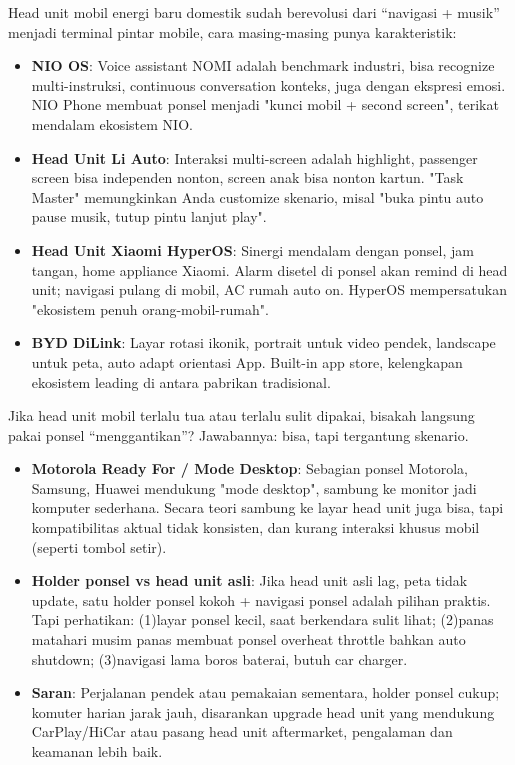 Head unit mobil energi baru domestik sudah berevolusi dari “navigasi + musik” menjadi terminal pintar mobile, cara masing-masing punya karakteristik:

\begin{itemize}
  \item \textbf{NIO OS}: Voice assistant NOMI adalah benchmark industri, bisa recognize multi-instruksi, continuous conversation konteks, juga dengan ekspresi emosi. NIO Phone membuat ponsel menjadi "kunci mobil + second screen", terikat mendalam ekosistem NIO.
  \item \textbf{Head Unit Li Auto}: Interaksi multi-screen adalah highlight, passenger screen bisa independen nonton, screen anak bisa nonton kartun. "Task Master" memungkinkan Anda customize skenario, misal "buka pintu auto pause musik, tutup pintu lanjut play".
  \item \textbf{Head Unit Xiaomi HyperOS}: Sinergi mendalam dengan ponsel, jam tangan, home appliance Xiaomi. Alarm disetel di ponsel akan remind di head unit; navigasi pulang di mobil, AC rumah auto on. HyperOS mempersatukan "ekosistem penuh orang-mobil-rumah".
  \item \textbf{BYD DiLink}: Layar rotasi ikonik, portrait untuk video pendek, landscape untuk peta, auto adapt orientasi App. Built-in app store, kelengkapan ekosistem leading di antara pabrikan tradisional.
\end{itemize}


Jika head unit mobil terlalu tua atau terlalu sulit dipakai, bisakah langsung pakai ponsel “menggantikan”? Jawabannya: bisa, tapi tergantung skenario.

\begin{itemize}
  \item \textbf{Motorola Ready For / Mode Desktop}: Sebagian ponsel Motorola, Samsung, Huawei mendukung "mode desktop", sambung ke monitor jadi komputer sederhana. Secara teori sambung ke layar head unit juga bisa, tapi kompatibilitas aktual tidak konsisten, dan kurang interaksi khusus mobil (seperti tombol setir).
  \item \textbf{Holder ponsel vs head unit asli}: Jika head unit asli lag, peta tidak update, satu holder ponsel kokoh + navigasi ponsel adalah pilihan praktis. Tapi perhatikan: (1)layar ponsel kecil, saat berkendara sulit lihat; (2)panas matahari musim panas membuat ponsel overheat throttle bahkan auto shutdown; (3)navigasi lama boros baterai, butuh car charger.
  \item \textbf{Saran}: Perjalanan pendek atau pemakaian sementara, holder ponsel cukup; komuter harian jarak jauh, disarankan upgrade head unit yang mendukung CarPlay/HiCar atau pasang head unit aftermarket, pengalaman dan keamanan lebih baik.
\end{itemize}

